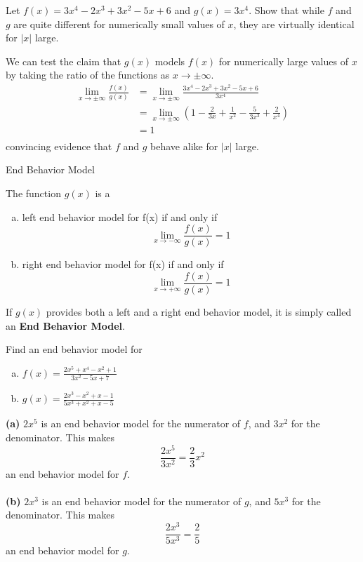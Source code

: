 \begin{example}{Let $f(x) = 3x^4 - 2x^3 + 3x^2 - 5x + 6$ and $g(x) = 3x^4$. Show that while $f$ and $g$ are quite different for numerically small values of $x$, they are virtually identical for $|x|$ large.}
    
    We can test the claim that $g(x)$ models $f(x)$ for numerically large values of $x$ by taking the ratio of the functions as $x \to \pm \infty$. \\
    \begin{align*}
        \lim_{x \to \pm\infty} \frac{f(x)}{g(x)} &= \lim_{x \to \pm\infty} \frac{3x^4-2x^3+3x^2-5x+6}{3x^4} \\
        &= \lim_{x \to \pm\infty} \left( 1 - \frac{2}{3x} + \frac{1}{x^2} - \frac{5}{3x^3} + \frac{2}{x^4} \right)  \\
        &= 1 \\
    \end{align*}
    convincing evidence that $f$ and $g$ behave alike for $|x|$ large.
\end{example}

\begin{definition}{End Behavior Model}

    The function $g(x)$ is a
    \begin{enumerate}[(a)]
        \item left end behavior model for f(x) if and only if \[ \lim_{x \to -\infty} \frac{f(x)}{g(x)} = 1 \]
        \item right end behavior model for f(x) if and only if \[ \lim_{x \to +\infty} \frac{f(x)}{g(x)} = 1 \]
    \end{enumerate}
    If $g(x)$ provides both a left and a right end behavior model, it is simply called an \textbf{End Behavior Model}.
\end{definition}

\begin{example}{Find an end behavior model for
    \begin{enumerate}[(a)]
        \item $f(x) = \frac{2x^5+x^4-x^2+1}{3x^2-5x+7}$
        \item $g(x) = \frac{2x^3-x^2+x-1}{5x^3+x^2+x-5}$
    \end{enumerate}}
    
    \textbf{(a)} $2x^5$ is an end behavior model for the numerator of $f$, and $3x^2$ for the denominator. This makes \[
        \frac{2x^5}{3x^2} = \frac{2}{3}x^2
    \] an end behavior model for $f$. \\~\\
    \textbf{(b)} $2x^3$ is an end behavior model for the numerator of $g$, and $5x^3$ for the denominator. This makes \[
        \frac{2x^3}{5x^3} = \frac{2}{5}
    \] an end behavior model for $g$.
\end{example}

